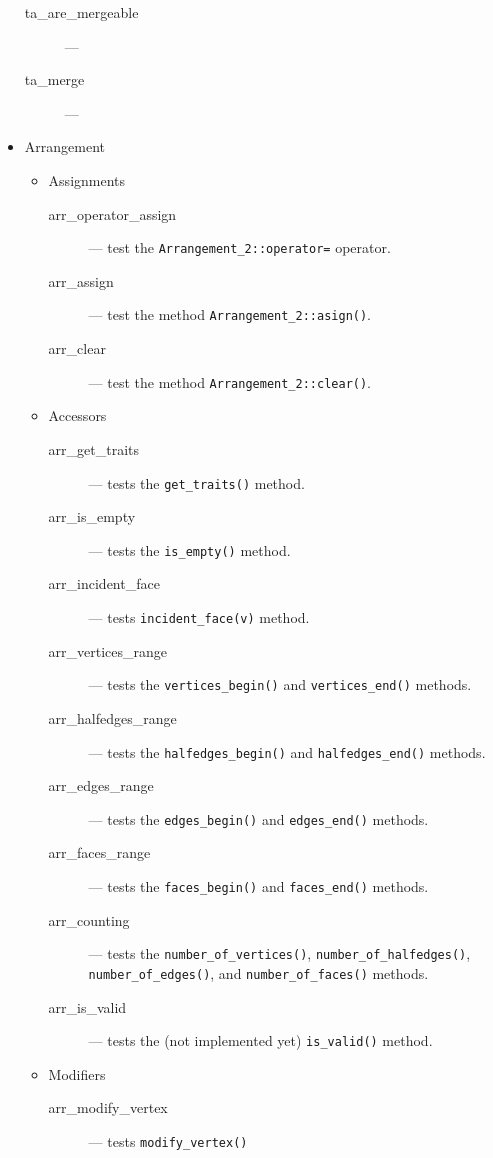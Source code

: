 \documentclass[11pt,a4paper]{article}
\begin{document}
\begin{itemize}
  \begin{description}
  \item[ta\_are\_mergeable] ---
  \item[ta\_merge] ---
  \end{description}  
\item Arrangement
  \begin{itemize}
  \item Assignments
    \begin{description}
    \item[arr\_operator\_assign] --- test the {\tt Arrangement\_2::operator=}
      operator.
    \item[arr\_assign] --- test the method {\tt Arrangement\_2::asign()}.
    \item[arr\_clear] --- test the method {\tt Arrangement\_2::clear()}.
    \end{description}  
  \item Accessors
    \begin{description}
    \item[arr\_get\_traits] --- tests the {\tt get\_traits()} method.
    \item[arr\_is\_empty] --- tests the {\tt is\_empty()} method.
    \item[arr\_incident\_face] --- tests {\tt incident\_face(v)} method.
    \item[arr\_vertices\_range] --- tests the {\tt vertices\_begin()} and
      {\tt vertices\_end()} methods.
    \item[arr\_halfedges\_range] --- tests the {\tt halfedges\_begin()} and
      {\tt halfedges\_end()} methods.
    \item[arr\_edges\_range] --- tests the {\tt edges\_begin()} and
      {\tt edges\_end()} methods.
    \item[arr\_faces\_range] --- tests the {\tt faces\_begin()} and
      {\tt faces\_end()} methods.
    \item[arr\_counting] --- tests the {\tt number\_of\_vertices()},
      {\tt number\_of\_halfedges()}, {\tt number\_of\_edges()}, and
      {\tt number\_of\_faces()} methods.
    \item[arr\_is\_valid] --- tests the (not implemented yet) {\tt is\_valid()}
      method.
    \end{description}  
  \item Modifiers
    \begin{description}
    \item[arr\_modify\_vertex] --- tests {\tt modify\_vertex()}

\end{description}
\end{itemize}
\end{itemize}
\end{document}
